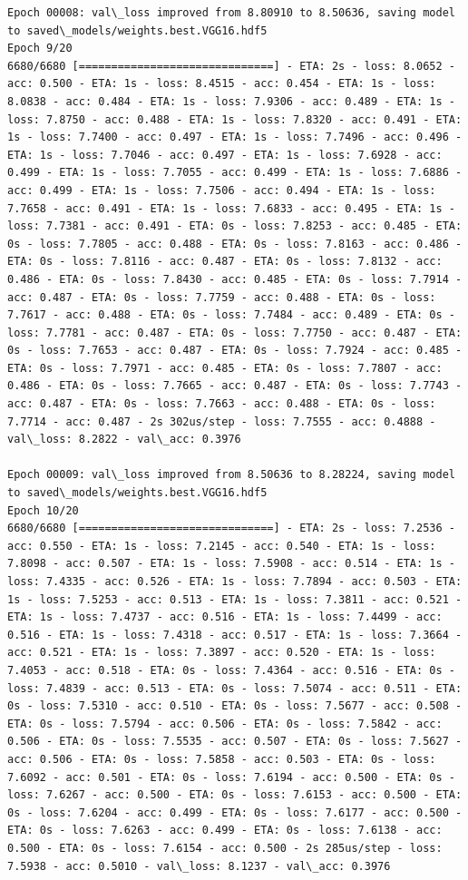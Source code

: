 \documentclass[11pt]{article}
\begin{document}
\begin{Verbatim}[commandchars=\\\{\}]
Epoch 00008: val\_loss improved from 8.80910 to 8.50636, saving model to saved\_models/weights.best.VGG16.hdf5
Epoch 9/20
6680/6680 [==============================] - ETA: 2s - loss: 8.0652 - acc: 0.500 - ETA: 1s - loss: 8.4515 - acc: 0.454 - ETA: 1s - loss: 8.0838 - acc: 0.484 - ETA: 1s - loss: 7.9306 - acc: 0.489 - ETA: 1s - loss: 7.8750 - acc: 0.488 - ETA: 1s - loss: 7.8320 - acc: 0.491 - ETA: 1s - loss: 7.7400 - acc: 0.497 - ETA: 1s - loss: 7.7496 - acc: 0.496 - ETA: 1s - loss: 7.7046 - acc: 0.497 - ETA: 1s - loss: 7.6928 - acc: 0.499 - ETA: 1s - loss: 7.7055 - acc: 0.499 - ETA: 1s - loss: 7.6886 - acc: 0.499 - ETA: 1s - loss: 7.7506 - acc: 0.494 - ETA: 1s - loss: 7.7658 - acc: 0.491 - ETA: 1s - loss: 7.6833 - acc: 0.495 - ETA: 1s - loss: 7.7381 - acc: 0.491 - ETA: 0s - loss: 7.8253 - acc: 0.485 - ETA: 0s - loss: 7.7805 - acc: 0.488 - ETA: 0s - loss: 7.8163 - acc: 0.486 - ETA: 0s - loss: 7.8116 - acc: 0.487 - ETA: 0s - loss: 7.8132 - acc: 0.486 - ETA: 0s - loss: 7.8430 - acc: 0.485 - ETA: 0s - loss: 7.7914 - acc: 0.487 - ETA: 0s - loss: 7.7759 - acc: 0.488 - ETA: 0s - loss: 7.7617 - acc: 0.488 - ETA: 0s - loss: 7.7484 - acc: 0.489 - ETA: 0s - loss: 7.7781 - acc: 0.487 - ETA: 0s - loss: 7.7750 - acc: 0.487 - ETA: 0s - loss: 7.7653 - acc: 0.487 - ETA: 0s - loss: 7.7924 - acc: 0.485 - ETA: 0s - loss: 7.7971 - acc: 0.485 - ETA: 0s - loss: 7.7807 - acc: 0.486 - ETA: 0s - loss: 7.7665 - acc: 0.487 - ETA: 0s - loss: 7.7743 - acc: 0.487 - ETA: 0s - loss: 7.7663 - acc: 0.488 - ETA: 0s - loss: 7.7714 - acc: 0.487 - 2s 302us/step - loss: 7.7555 - acc: 0.4888 - val\_loss: 8.2822 - val\_acc: 0.3976

Epoch 00009: val\_loss improved from 8.50636 to 8.28224, saving model to saved\_models/weights.best.VGG16.hdf5
Epoch 10/20
6680/6680 [==============================] - ETA: 2s - loss: 7.2536 - acc: 0.550 - ETA: 1s - loss: 7.2145 - acc: 0.540 - ETA: 1s - loss: 7.8098 - acc: 0.507 - ETA: 1s - loss: 7.5908 - acc: 0.514 - ETA: 1s - loss: 7.4335 - acc: 0.526 - ETA: 1s - loss: 7.7894 - acc: 0.503 - ETA: 1s - loss: 7.5253 - acc: 0.513 - ETA: 1s - loss: 7.3811 - acc: 0.521 - ETA: 1s - loss: 7.4737 - acc: 0.516 - ETA: 1s - loss: 7.4499 - acc: 0.516 - ETA: 1s - loss: 7.4318 - acc: 0.517 - ETA: 1s - loss: 7.3664 - acc: 0.521 - ETA: 1s - loss: 7.3897 - acc: 0.520 - ETA: 1s - loss: 7.4053 - acc: 0.518 - ETA: 0s - loss: 7.4364 - acc: 0.516 - ETA: 0s - loss: 7.4839 - acc: 0.513 - ETA: 0s - loss: 7.5074 - acc: 0.511 - ETA: 0s - loss: 7.5310 - acc: 0.510 - ETA: 0s - loss: 7.5677 - acc: 0.508 - ETA: 0s - loss: 7.5794 - acc: 0.506 - ETA: 0s - loss: 7.5842 - acc: 0.506 - ETA: 0s - loss: 7.5535 - acc: 0.507 - ETA: 0s - loss: 7.5627 - acc: 0.506 - ETA: 0s - loss: 7.5858 - acc: 0.503 - ETA: 0s - loss: 7.6092 - acc: 0.501 - ETA: 0s - loss: 7.6194 - acc: 0.500 - ETA: 0s - loss: 7.6267 - acc: 0.500 - ETA: 0s - loss: 7.6153 - acc: 0.500 - ETA: 0s - loss: 7.6204 - acc: 0.499 - ETA: 0s - loss: 7.6177 - acc: 0.500 - ETA: 0s - loss: 7.6263 - acc: 0.499 - ETA: 0s - loss: 7.6138 - acc: 0.500 - ETA: 0s - loss: 7.6154 - acc: 0.500 - 2s 285us/step - loss: 7.5938 - acc: 0.5010 - val\_loss: 8.1237 - val\_acc: 0.3976


\end{Verbatim}
\end{document}
